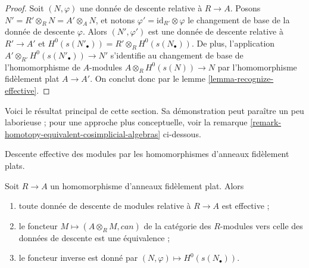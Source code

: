 \begin{proof}
Soit $(N, \varphi)$ une donnée de descente relative à $R \to A$.
Posons $N' = R' \otimes_R N = A' \otimes_A N$, et notons
$\varphi' = \text{id}_{R'} \otimes \varphi$ le changement de base
de la donnée de descente $\varphi$. Alors $(N', \varphi')$ est
une donnée de descente relative à $R' \to A'$ et
$H^0(s(N'_\bullet)) = R' \otimes_R H^0(s(N_\bullet))$.
De plus, l'application
$A' \otimes_{R'} H^0(s(N'_\bullet)) \to N'$
s'identifie au changement de base de l'homomorphisme de $A$-modules
$A \otimes_R H^0(s(N)) \to N$ par l'homomorphisme fidèlement plat
$A \to A'$. On conclut donc par le lemme \ref{lemma-recognize-effective}.
\end{proof}

\noindent
Voici le résultat principal de cette section.
Sa démonstration peut paraître un peu laborieuse ; pour une approche
plus conceptuelle, voir la remarque
\ref{remark-homotopy-equivalent-cosimplicial-algebras} ci-dessous.

\begin{proposition}
\label{proposition-descent-module}
\begin{slogan}
Descente effective des modules par les homomorphismes d'anneaux fidèlement plats.
\end{slogan}
Soit $R \to A$ un homomorphisme d'anneaux fidèlement plat.
Alors
\begin{enumerate}
\item toute donnée de descente de modules relative à $R \to A$
est effective ;
\item le foncteur $M \mapsto (A \otimes_R M, can)$ de la catégorie des $R$-modules
vers celle des données de descente est une équivalence ;
\item le foncteur inverse est donné par $(N, \varphi) \mapsto H^0(s(N_\bullet))$.
\end{enumerate}
\end{proposition}

